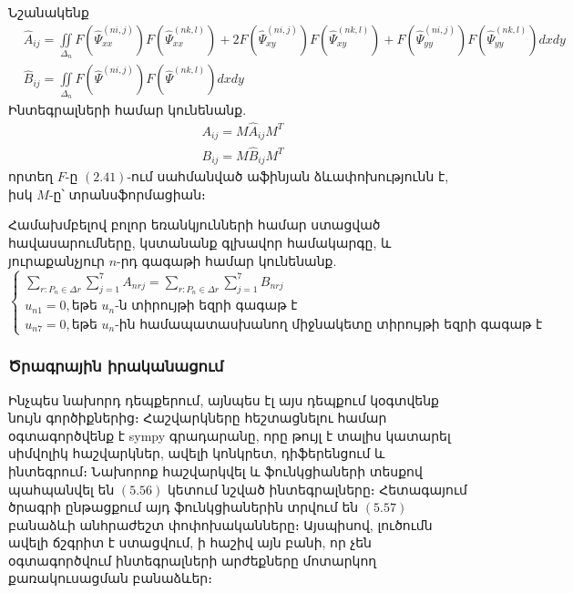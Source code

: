\documentclass[fleqn, bachelor,subf,12pt,notitlepage]{article}
\begin{document}
Նշանակենք
\begin{equation}
\begin{aligned}
&\hat{A}_{ij} = \iint \limits_{\Delta_{n}} F\left(\hat{\Psi}^{(ni,j)}_{xx}\right)F\left(\hat{\Psi}^{(nk,l)}_{xx}\right) + 2F\left(\hat{\Psi}^{(ni,j)}_{xy}\right)F\left(\hat{\Psi}^{(nk,l)}_{xy}\right) + F\left(\hat{\Psi}^{(ni,j)}_{yy}\right)F\left(\hat{\Psi}^{(nk,l)}_{yy}\right)dxdy \\
&\hat{B}_{ij} = \iint \limits_{\Delta_{n}} F\left(\hat{\Psi}^{(ni,j)}\right)F\left(\hat{\Psi}^{(nk,l)}\right)dxdy
\end{aligned}
\end{equation}
 Ինտեգրալների համար կունենանք.
\begin{equation}
\begin{aligned}
& A_{ij} = M\hat{A}_{ij}M^{T} \\
& B_{ij} = M\hat{B}_{ij}M^{T}
\end{aligned}
\end{equation}
որտեղ $F$-ը $(2.41)$-ում սահմանված աֆինյան ձևափոխությունն է, իսկ $M$-ը՝ տրանսֆորմացիան։

Համախմբելով բոլոր եռանկյունների համար ստացված հավասարումները, կստանանք գլխավոր համակարգը, և յուրաքանչյուր $n$-րդ գագաթի համար կունենանք.
\begin{equation}
\begin{cases}
\sum_{r: P_{n}\in \Delta{r}}\sum_{j=1}^{7}  A_{nrj} = \sum_{r: P_{n}\in \Delta{r}}\sum_{j=1}^{7}B_{nrj}\\
u_{n1} = 0, \text{եթե } u_{n}\text{-ն տիրույթի եզրի գագաթ է} \\
u_{n7} = 0, \text{եթե } u_{n}\text{-ին համապատասխանող միջնակետը տիրույթի եզրի գագաթ է}
\end{cases}
\end{equation}

\newpage
\subsubsection*{{Ծրագրային իրականացում}}

Ինչպես նախորդ դեպքերում, այնպես էլ այս դեպքում կօգտվենք նույն գործիքներից։
Հաշվարկները հեշտացնելու համար օգտագործվենք է sympy գրադարանը, որը թույլ է տալիս կատարել սիմվոլիկ հաշվարկներ, ավելի կոնկրետ, դիֆերենցում և ինտեգրում։ Նախորոք հաշվարկվել և ֆունկցիաների տեսքով պահպանվել են $(5.56)$ կետում նշված ինտեգրալները։ Հետագայում ծրագրի ընթացքում այդ ֆունկցիաներին տրվում են $(5.57)$ բանաձևի անհրաժեշտ փոփոխականները։ Այսպիսով, լուծումն ավելի ճշգրիտ է ստացվում, ի հաշիվ այն բանի, որ չեն օգտագործվում ինտեգրալների արժեքները մոտարկող քառակուսացման բանաձևեր։
\end{document}
